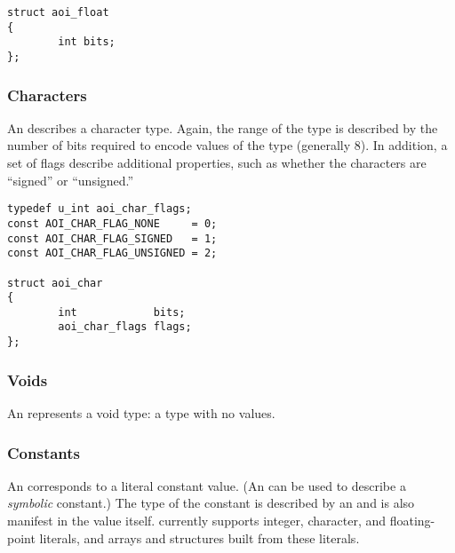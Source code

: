 \begin{verbatim}
struct aoi_float
{
        int bits;
};
\end{verbatim}


\subsubsection{Characters}

An  describes a character type.  Again, the range of the type is
described by the number of bits required to encode values of the type
(generally 8).  In addition, a set of flags describe additional properties,
such as whether the characters are ``signed'' or ``unsigned.''

\begin{verbatim}
typedef u_int aoi_char_flags;
const AOI_CHAR_FLAG_NONE     = 0;
const AOI_CHAR_FLAG_SIGNED   = 1;
const AOI_CHAR_FLAG_UNSIGNED = 2;

struct aoi_char
{
        int            bits;
        aoi_char_flags flags;
};
\end{verbatim}


\subsubsection{Voids}

An  represents a void type: a type with no values.


\subsubsection{Constants}

An  corresponds to a literal constant value.  (An 
can be used to describe a \emph{symbolic} constant.)  The type of the constant
is described by an  and is also manifest in the 
value itself.  \AOI{} currently supports integer, character, and floating-point
literals, and arrays and structures built from these literals.

